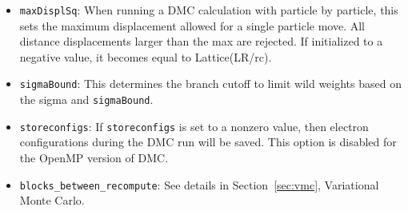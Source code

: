 \begin{itemize}
\item \texttt{maxDisplSq}:  When running a DMC calculation with particle by particle, this sets the maximum displacement allowed for a single particle move.  All distance displacements larger than the max are rejected.  If initialized to a negative value, it becomes equal to Lattice(LR/rc).

\item \texttt{sigmaBound}:  This determines the branch cutoff to limit wild weights based on the sigma and \texttt{sigmaBound}.


\item \texttt{storeconfigs}: If \texttt{storeconfigs} is set to a nonzero value, then electron configurations during the DMC run will be saved. This option is disabled for the OpenMP version of DMC.

\item \texttt{blocks\_between\_recompute}: See details in Section~\ref{sec:vmc}, Variational Monte Carlo.










\end{itemize}
